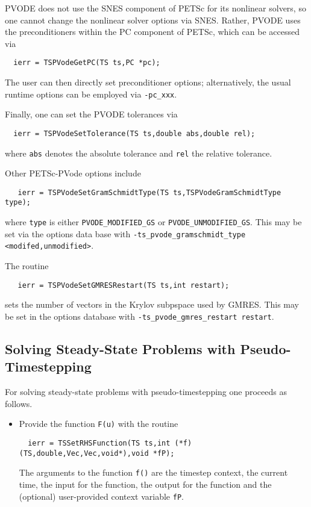 {PVODE does not use the SNES component of PETSc for its nonlinear
solvers, so one cannot change the nonlinear solver options via
SNES. Rather, PVODE uses the preconditioners within the PC component
of PETSc, which can be accessed via
\begin{verbatim}
  ierr = TSPVodeGetPC(TS ts,PC *pc);
\end{verbatim}
The user can then directly set preconditioner options; 
alternatively, the usual runtime options can be employed
via {\tt -pc\_xxx}. 

Finally, one can set the PVODE tolerances via
\begin{verbatim}
  ierr = TSPVodeSetTolerance(TS ts,double abs,double rel);
\end{verbatim}
where {\tt abs} denotes the absolute tolerance and {\tt rel}
the relative tolerance. 

Other PETSc-PVode options include
\begin{verbatim}
   ierr = TSPVodeSetGramSchmidtType(TS ts,TSPVodeGramSchmidtType type);
\end{verbatim}
where {\tt type} is either {\tt PVODE\_MODIFIED\_GS} or 
{\tt PVODE\_UNMODIFIED\_GS}. 
 
 This may be set via the options data base
with {\tt -ts\_pvode\_gramschmidt\_type <modifed,unmodified>}.

The routine 
\begin{verbatim}
   ierr = TSPVodeSetGMRESRestart(TS ts,int restart);
\end{verbatim}
sets the number of vectors in the Krylov subpspace used by GMRES.
 This may be set in the options 
database with {\tt -ts\_pvode\_gmres\_restart restart}. 


\subsection{Solving Steady-State Problems with Pseudo-Timestepping}

For solving steady-state problems with pseudo-timestepping one proceeds 
as follows.
\begin{itemize}
\item Provide the function {\tt F(u)} with the routine
\begin{verbatim}
  ierr = TSSetRHSFunction(TS ts,int (*f)(TS,double,Vec,Vec,void*),void *fP);
\end{verbatim}
The  arguments to the function {\tt f()} are
the timestep context, the current time, the input for the function,
the output for the function and the (optional) user-provided context
variable {\tt fP}.


\end{itemize}}
